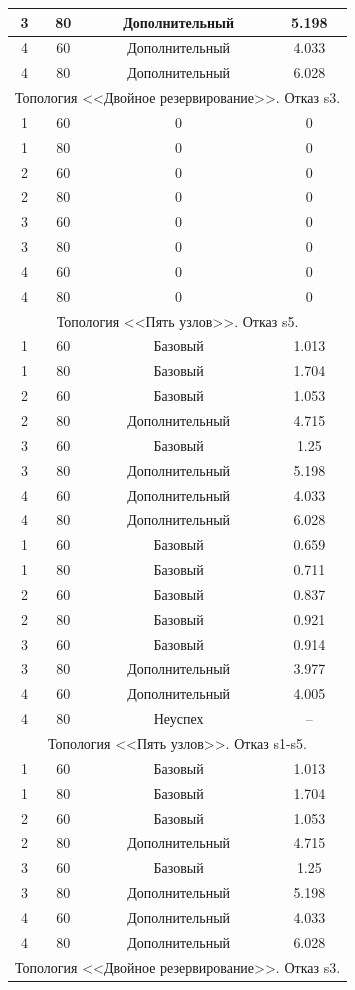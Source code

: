 \documentclass[12pt, a4paper]{article}
\begin{document}
\begin{longtable}[c]{|c|c|c|c|}
		3 & 80 & Дополнительный & 5.198 \\ \hline
		4 & 60 & Дополнительный & 4.033 \\ \hline
		4 & 80 & Дополнительный & 6.028 \\ \hline
		\multicolumn{4}{|c|}{Топология <<Двойное резервирование>>. Отказ s3.} \\ \hline
		1 & 60 & 0 & 0 \\ \hline
		1 & 80 & 0 & 0 \\ \hline
		2 & 60 & 0 & 0 \\ \hline
		2 & 80 & 0 & 0 \\ \hline
		3 & 60 & 0 & 0 \\ \hline
		3 & 80 & 0 & 0 \\ \hline
		4 & 60 & 0 & 0 \\ \hline
		4 & 80 & 0 & 0 \\ \hline
		\multicolumn{4}{|c|}{Топология <<Пять узлов>>. Отказ s5.} \\ \hline
		1 & 60 & Базовый & 1.013 \\ \hline
		1 & 80 & Базовый & 1.704 \\ \hline
		2 & 60 & Базовый & 1.053 \\ \hline
		2 & 80 & Дополнительный & 4.715 \\ \hline
		3 & 60 & Базовый & 1.25 \\ \hline
		3 & 80 & Дополнительный & 5.198 \\ \hline
		4 & 60 & Дополнительный & 4.033 \\ \hline
		4 & 80 & Дополнительный & 6.028 \\ \hline
		1 & 60 & Базовый & 0.659 \\ \hline
		1 & 80 & Базовый & 0.711 \\ \hline
		2 & 60 & Базовый & 0.837 \\ \hline
		2 & 80 & Базовый & 0.921 \\ \hline
		3 & 60 & Базовый & 0.914 \\ \hline
		3 & 80 & Дополнительный & 3.977  \\ \hline
		4 & 60 & Дополнительный & 4.005 \\ \hline
		4 & 80 & Неуспех & -- \\ \hline
		\multicolumn{4}{|c|}{Топология <<Пять узлов>>. Отказ s1-s5.} \\ \hline
		1 & 60 & Базовый & 1.013 \\ \hline
		1 & 80 & Базовый & 1.704 \\ \hline
		2 & 60 & Базовый & 1.053 \\ \hline
		2 & 80 & Дополнительный & 4.715 \\ \hline
		3 & 60 & Базовый & 1.25 \\ \hline
		3 & 80 & Дополнительный & 5.198 \\ \hline
		4 & 60 & Дополнительный & 4.033 \\ \hline
		4 & 80 & Дополнительный & 6.028 \\ \hline
		\multicolumn{4}{|c|}{Топология <<Двойное резервирование>>. Отказ s3.} \\
		
	\end{longtable}
\end{document}
